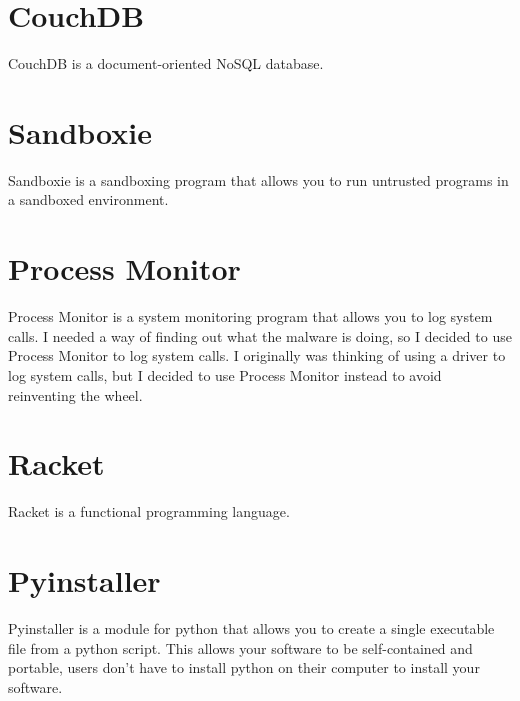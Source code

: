 \section{CouchDB}
CouchDB is a document-oriented NoSQL database.

\section{Sandboxie}
Sandboxie is a sandboxing program that allows you to run untrusted programs in a sandboxed environment.

\section{Process Monitor}
Process Monitor is a system monitoring program that allows you to log system calls.
I needed a way of finding out what the malware is doing, so I decided to use Process Monitor to log system calls.
I originally was thinking of using a driver to log system calls, but I decided to use Process Monitor instead to avoid reinventing the wheel.

\section{Racket}
Racket is a functional programming language.

\section{Pyinstaller}
Pyinstaller is a module for python that allows you to create a single executable file from a python script.
This allows your software to be self-contained and portable, users don't have to install python on their computer to install your software.

